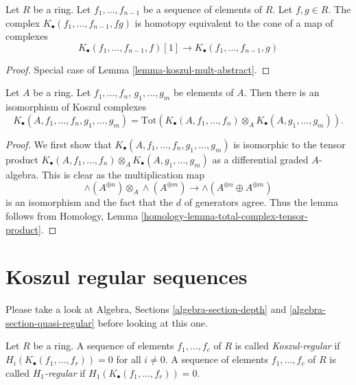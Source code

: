 \begin{lemma}
\label{lemma-koszul-mult}
Let $R$ be a ring. Let $f_1, \ldots, f_{n - 1}$ be a sequence of elements
of $R$. Let $f, g \in R$. The complex
$K_\bullet(f_1, \ldots, f_{n - 1}, fg)$
is homotopy equivalent to the cone of a map of complexes
$$
K_\bullet(f_1, \ldots, f_{n - 1}, f)[1]
\longrightarrow
K_\bullet(f_1, \ldots, f_{n - 1}, g)
$$
\end{lemma}

\begin{proof}
Special case of
Lemma \ref{lemma-koszul-mult-abstract}.
\end{proof}

\begin{lemma}
\label{lemma-join-sequences-koszul-complex}
Let $A$ be a ring.
Let $f_1, \ldots, f_n$, $g_1, \ldots, g_m$ be elements of $A$.
Then there is an isomorphism of Koszul complexes
$$
K_\bullet(A, f_1, \ldots, f_n, g_1, \ldots, g_m) =
\text{Tot}(K_\bullet(A, f_1, \ldots, f_n) \otimes_A
K_\bullet(A, g_1, \ldots, g_m)).
$$
\end{lemma}

\begin{proof}
We first show that $K_\bullet(A, f_1, \ldots, f_n, g_1, \ldots, g_m)$ is
isomorphic to the tensor product
$K_\bullet(A, f_1, \ldots, f_n) \otimes_A K_\bullet(A, g_1, \ldots, g_m)$
as a differential graded $A$-algebra. This is clear as the multiplication map
$$
\wedge(A^{\oplus n}) \otimes_A \wedge(A^{\oplus m})
\longrightarrow
\wedge(A^{\oplus n} \oplus A^{\oplus m})
$$
is an isomorphism and the fact that the $d$ of generators agree.
Thus the lemma follows from
Homology, Lemma \ref{homology-lemma-total-complex-tensor-product}.
\end{proof}





\section{Koszul regular sequences}
\label{section-koszul-regular}

\noindent
Please take a look at
Algebra, Sections \ref{algebra-section-depth} and
\ref{algebra-section-quasi-regular}
before looking at this one.

\begin{definition}
\label{definition-koszul-regular-sequence}
Let $R$ be a ring.
A sequence of elements $f_1, \ldots, f_c$ of $R$ is called
{\it Koszul-regular} if $H_i(K_\bullet(f_1, \ldots, f_r)) = 0$ for
all $i \not = 0$.
A sequence of elements $f_1, \ldots, f_c$ of $R$ is called
{\it $H_1$-regular} if $H_1(K_\bullet(f_1, \ldots, f_r)) = 0$.
\end{definition}

